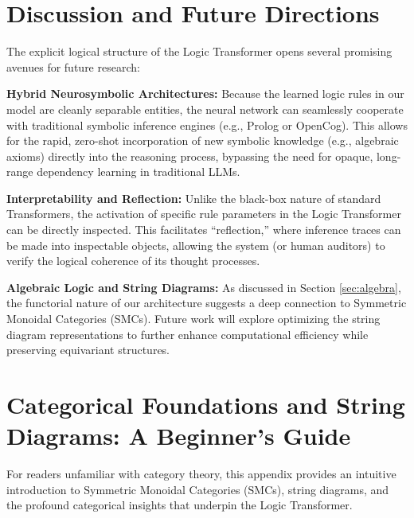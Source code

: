 \documentclass[runningheads]{llncs}
\begin{document}
\section{Discussion and Future Directions}
\label{sec:discussion}
The explicit logical structure of the Logic Transformer opens several promising avenues for future research:

\textbf{Hybrid Neurosymbolic Architectures:} Because the learned logic rules in our model are cleanly separable entities, the neural network can seamlessly cooperate with traditional symbolic inference engines (e.g., Prolog or OpenCog). This allows for the rapid, zero-shot incorporation of new symbolic knowledge (e.g., algebraic axioms) directly into the reasoning process, bypassing the need for opaque, long-range dependency learning in traditional LLMs.

\textbf{Interpretability and Reflection:} Unlike the black-box nature of standard Transformers, the activation of specific rule parameters in the Logic Transformer can be directly inspected. This facilitates ``reflection,'' where inference traces can be made into inspectable objects, allowing the system (or human auditors) to verify the logical coherence of its thought processes.

\textbf{Algebraic Logic and String Diagrams:} As discussed in Section \ref{sec:algebra}, the functorial nature of our architecture suggests a deep connection to Symmetric Monoidal Categories (SMCs). Future work will explore optimizing the string diagram representations to further enhance computational efficiency while preserving equivariant structures.

\appendix

\section{Categorical Foundations and String Diagrams: A Beginner's Guide}
\label{app:category}

For readers unfamiliar with category theory, this appendix provides an intuitive introduction to Symmetric Monoidal Categories (SMCs), string diagrams, and the profound categorical insights that underpin the Logic Transformer.
\end{document}
